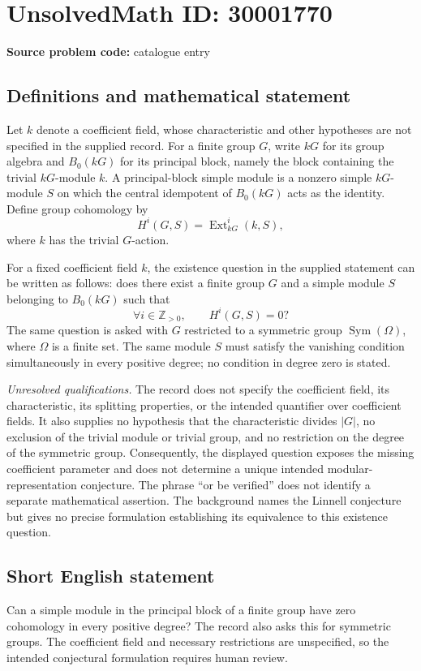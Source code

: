 \documentclass[11pt]{article}
\newcommand{\Z}{\mathbb{Z}}
\begin{document}
\section*{UnsolvedMath ID: 30001770}
\textbf{Source problem code:} catalogue entry
\subsection{Definitions and mathematical statement}
Let \(k\) denote a coefficient field, whose characteristic and other hypotheses are not specified in the supplied record. For a finite group \(G\), write \(kG\) for its group algebra and \(B_0(kG)\) for its principal block, namely the block containing the trivial \(kG\)-module \(k\). A principal-block simple module is a nonzero simple \(kG\)-module \(S\) on which the central idempotent of \(B_0(kG)\) acts as the identity. Define group cohomology by
\[
H^i(G,S)=\operatorname{Ext}_{kG}^{i}(k,S),
\]
where \(k\) has the trivial \(G\)-action.

For a fixed coefficient field \(k\), the existence question in the supplied statement can be written as follows: does there exist a finite group \(G\) and a simple module \(S\) belonging to \(B_0(kG)\) such that
\[
\forall i\in\Z_{>0},\qquad H^i(G,S)=0?
\]
The same question is asked with \(G\) restricted to a symmetric group \(\operatorname{Sym}(\Omega)\), where \(\Omega\) is a finite set. The same module \(S\) must satisfy the vanishing condition simultaneously in every positive degree; no condition in degree zero is stated.

\textit{Unresolved qualifications.} The record does not specify the coefficient field, its characteristic, its splitting properties, or the intended quantifier over coefficient fields. It also supplies no hypothesis that the characteristic divides \(|G|\), no exclusion of the trivial module or trivial group, and no restriction on the degree of the symmetric group. Consequently, the displayed question exposes the missing coefficient parameter and does not determine a unique intended modular-representation conjecture. The phrase ``or be verified'' does not identify a separate mathematical assertion. The background names the Linnell conjecture but gives no precise formulation establishing its equivalence to this existence question.
\subsection{Short English statement}
Can a simple module in the principal block of a finite group have zero cohomology in every positive degree? The record also asks this for symmetric groups. The coefficient field and necessary restrictions are unspecified, so the intended conjectural formulation requires human review.
\end{document}
